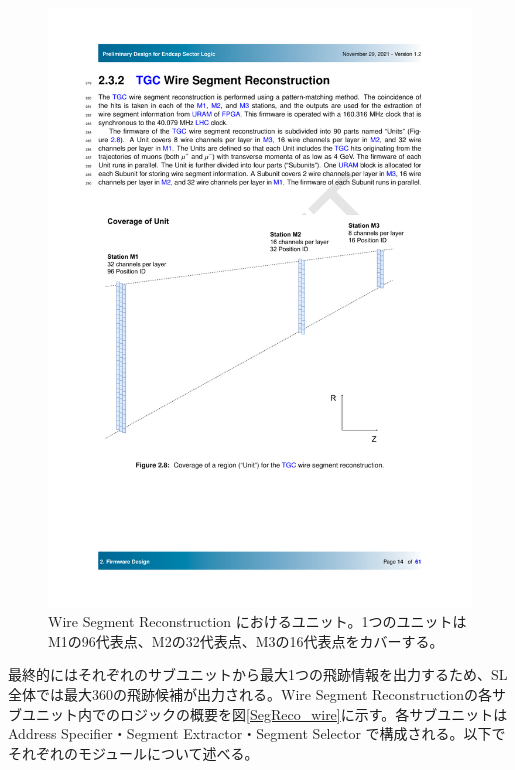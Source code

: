 \begin{figure} 
    \centering
    \includegraphics[width=12cm]{fig/SL/StationCoin_unit.pdf}
    \caption[Wire Segment Reconstruction におけるユニット]{Wire Segment Reconstruction におけるユニット。1つのユニットはM1の96代表点、M2の32代表点、M3の16代表点をカバーする。\cite{SLPDR}}
    \label{StationCoin_unit}
\end{figure}

最終的にはそれぞれのサブユニットから最大1つの飛跡情報を出力するため、SL全体では最大360の飛跡候補が出力される。Wire Segment Reconstructionの各サブユニット内でのロジックの概要を図\ref{SegReco_wire}に示す。各サブユニットはAddress Specifier・Segment Extractor・Segment Selector で構成される。以下でそれぞれのモジュールについて述べる。

